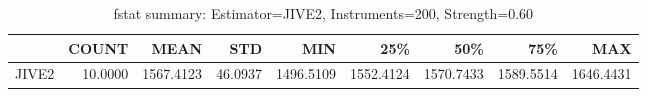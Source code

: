 \begin{table}[ht]
\centering
\caption{fstat summary: Estimator=JIVE2, Instruments=200, Strength=0.60}
\begin{tabular}{lrrrrrrrr}
\toprule
 & COUNT & MEAN & STD & MIN & 25\% & 50\% & 75\% & MAX \\
\midrule
JIVE2 & 10.0000 & 1567.4123 & 46.0937 & 1496.5109 & 1552.4124 & 1570.7433 & 1589.5514 & 1646.4431 \\
\bottomrule
\end{tabular}
\end{table}
